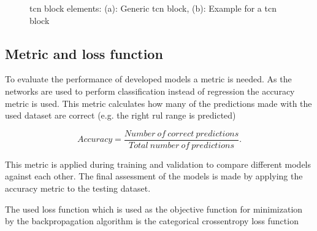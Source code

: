 \documentclass[conference]{IEEEtran}
\begin{document}
\begin{figure}[htp]
	\centering
	\quad
	\caption{\gls{tcn} block elements: (a): Generic \gls{tcn} block, (b): Example for a \gls{tcn} block \cite{Bai2018}}
	\label{fig:tcn_block}
\end{figure}



\subsection{Metric and loss function}
\label{sec:metric_and_loss_function}

To evaluate the performance of developed models a metric is needed. As the networks are used to perform classification instead of regression the accuracy metric is used. This metric calculates how many of the predictions made with the used dataset are correct (e.g. the right \gls{rul} range is predicted)

\begin{equation}
	\label{eq:accuracy_metric}
	Accuracy = \frac{Number \: of \: correct \: predictions}{Total \: number \: of \: predictions}.
\end{equation}

This metric is applied during training and validation to compare different models against each other. The final assessment of the models is made by applying the accuracy metric to the testing dataset.

The used loss function which is used as the objective function for minimization by the backpropagation algorithm is the categorical crossentropy loss function
\end{document}
